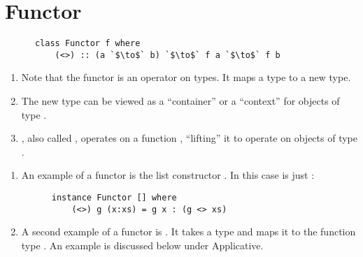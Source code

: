 \documentclass[12pt]{article}
\begin{document}
\section{Functor}
\begin{definition*}\hspace{0pt}
  \begin{normalfont}
    \begin{verbatim}
      class Functor f where
          (<>) :: (a `$\to$` b) `$\to$` f a `$\to$` f b
    \end{verbatim}
  \end{normalfont}
\end{definition*}


\begin{remark*}\hspace{0pt}
  \begin{enumerate}
  \item Note that the functor  is an operator on types. It maps a type to a new type.
  \item The new type can be viewed as a ``container'' or a ``context'' for objects of type .
  \item \mih{(<>)}, also called , operates on a function , ``lifting''
    it to operate on objects of type .
  \end{enumerate}
\end{remark*}


\begin{example*}\hspace{0pt}
  \begin{enumerate}

  \item An example of a functor is the list constructor \mih{[]}. In this case  is just
    :
    \begin{verbatim}
      instance Functor [] where
          (<>) g (x:xs) = g x : (g <> xs)
    \end{verbatim}

  \item A second example of a functor is . It takes a type  and maps it to the
    function type . An example is discussed below under Applicative.

  \end{enumerate}
\end{example*}
\end{document}
